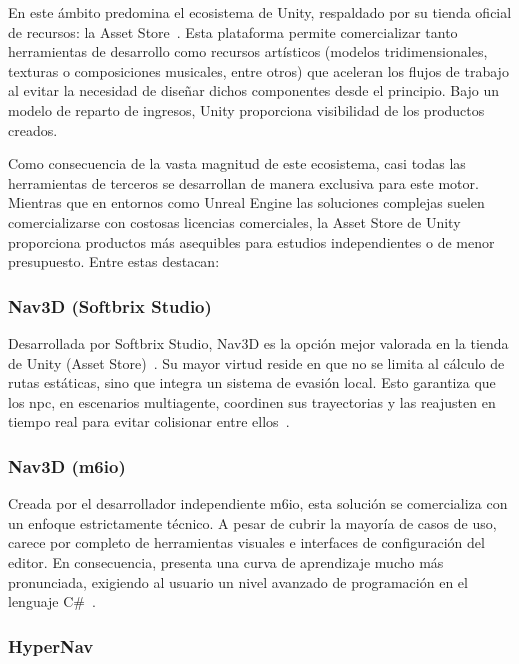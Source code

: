 En este ámbito predomina el ecosistema de Unity, respaldado por su tienda oficial de recursos: la Asset Store~\cite{assetstore}.
Esta plataforma permite comercializar tanto herramientas de desarrollo como recursos artísticos (modelos tridimensionales, texturas o composiciones musicales, entre otros) que aceleran los flujos de trabajo al evitar la necesidad de diseñar dichos componentes desde el principio.
Bajo un modelo de reparto de ingresos, Unity proporciona visibilidad de los productos creados.

Como consecuencia de la vasta magnitud de este ecosistema, casi todas las herramientas de terceros se desarrollan de manera exclusiva para este motor.
Mientras que en entornos como Unreal Engine las soluciones complejas suelen comercializarse con costosas licencias comerciales, la Asset Store de Unity proporciona productos más asequibles para estudios independientes o de menor presupuesto.
Entre estas destacan:

\subsubsection{Nav3D (Softbrix Studio)}

Desarrollada por Softbrix Studio, Nav3D es la opción mejor valorada en la tienda de Unity (Asset Store)~\cite{Nav3D_SoftbrixAssetStore}.
Su mayor virtud reside en que no se limita al cálculo de rutas estáticas, sino que integra un sistema de evasión local.
Esto garantiza que los \acrshort{npc}, en escenarios multiagente, coordinen sus trayectorias y las reajusten en tiempo real para evitar colisionar entre ellos~\cite{Nav3DPro}.

\subsubsection{Nav3D (m6io)}

Creada por el desarrollador independiente m6io, esta solución se comercializa con un enfoque estrictamente técnico.
A pesar de cubrir la mayoría de casos de uso, carece por completo de herramientas visuales e interfaces de configuración del editor.
En consecuencia, presenta una curva de aprendizaje mucho más pronunciada, exigiendo al usuario un nivel avanzado de programación en el lenguaje C\#~\cite{Nav3D_FlyingAIAssetStore}.

\subsubsection{HyperNav}

